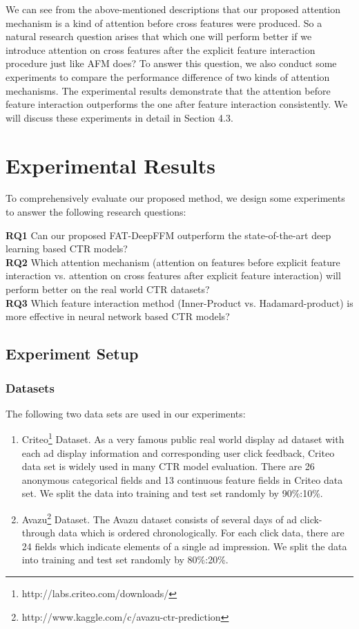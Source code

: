 \documentclass{article}
\begin{document}
We can see from the above-mentioned descriptions that our proposed attention mechanism is a kind of attention before cross features were produced. So a natural research question arises that which one will perform better if we introduce attention on cross features after the explicit feature interaction procedure just like AFM does? To answer this question, we also conduct some experiments to compare the performance difference of two kinds of attention mechanisms. The experimental results demonstrate that the attention before feature interaction outperforms the one after feature interaction consistently. We will discuss these experiments in detail in Section 4.3.

\section{Experimental Results}
To comprehensively evaluate our proposed method, we design some experiments to answer the following research questions:

\noindent\textbf{RQ1} Can our proposed FAT-DeepFFM outperform the state-of-the-art deep learning based CTR models? \\
\textbf{RQ2} Which attention mechanism (attention on features before explicit feature interaction vs. attention on cross features after explicit feature interaction) will perform better on the real world CTR datasets? \\
\textbf{RQ3} Which feature interaction method (Inner-Product vs. Hadamard-product) is more effective in neural network based CTR models?

\subsection{Experiment Setup}
\subsubsection{Datasets}
The following two data sets are used in our experiments:
\begin{enumerate}
    \item Criteo\footnote{http://labs.criteo.com/downloads/} Dataset. 
As a very famous public real world display ad dataset with each ad display information and corresponding user click feedback, Criteo data set is widely used in many CTR model evaluation.  There are 26 anonymous categorical fields and 13 continuous feature fields in Criteo data set. We split the data into training and test set randomly by 90\%:10\%.
   \item Avazu\footnote{http://www.kaggle.com/c/avazu-ctr-prediction} Dataset.
The Avazu dataset consists of several days of ad click-through data which is ordered chronologically. For each click data, there are 24 fields which indicate elements of a single ad impression. We split the data into training and test set randomly by 80\%:20\%.
\end{enumerate}
\end{document}
